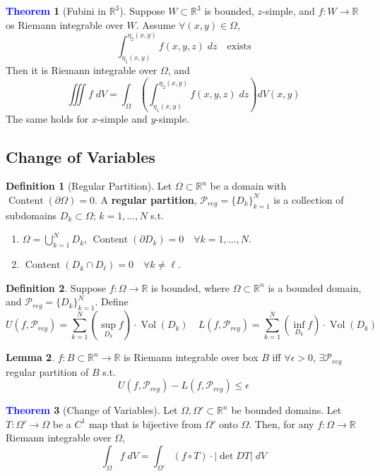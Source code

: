 \documentclass[11pt]{article}
\theoremstyle{definition}
\theoremstyle{definition}
\newcommand{\R}[0]{\mathbb{R}}
\DeclareMathOperator{\Vol}{Vol}
\DeclareMathOperator{\Content}{Content}
\newtheorem{theorem}{\textcolor{blue}{Theorem}}
\newtheorem{lemma}[theorem]{Lemma}
\theoremstyle{definition}
\newtheorem{definition}{\textcolor{OliveGreen}{Definition}}
\theoremstyle{remark}
\begin{document}
\begin{theorem}[Fubini in $\R^3$]
    Suppose $W \subset \R^3$ is bounded, $z$-simple, and $f : W \to \R$ os Riemann integrable over $W$. Assume
    $\forall (x,y) \in \Omega$, 
    \[
        \int_{\eta_1(x,y)}^{\eta_2(x,y)} f(x,y,z) \; dz \quad \text{exists}
    \]     
    Then it is Riemann integrable over $\Omega$, and
    \[
        \iiint f \; dV = \int_{\Omega} \left( \int_{\eta_1(x,y)}^{\eta_2(x,y)} f(x,y,z) \; dz \right) dV(x,y)
    \]   
    The same holds for $x$-simple and $y$-simple.  
\end{theorem}

\subsection{Change of Variables}

\begin{definition}[Regular Partition]
    Let $\Omega \subset \R^n$ be a domain with $\Content(\partial \Omega) = 0$. A \textbf{regular partition},
    $\mathcal{P}_{reg} = \{D_{k}\}_{k=1}^{N} $ is a collection of subdomains $D_k \subset \Omega$; $k = 1, \dots, N$ s.t.
    \begin{enumerate}
        \item $\Omega = \bigcup_{k = 1}^N D_k$, $\Content(\partial D_k) = 0 \quad \forall k = 1, \dots, N$.
        \item $\Content(D_k \cap D_\ell) = 0 \quad \forall k \neq \ell$.   
    \end{enumerate}     
\end{definition}

\begin{definition}
    Suppose $f : \Omega \to \R$ is bounded, where $\Omega \subset \R^n$ is a bounded domain, and $\mathcal{P}_{reg} = \{D_k\}_{k = 1}^N$.
    Define 
    \[
        U(f, \mathcal{P}_{reg}) = \sum_{k = 1}^N (\sup_{D_k} f) \cdot \Vol(D_k) \quad L(f, \mathcal{P}_{reg}) = \sum_{k = 1}^N (\inf_{D_k} f) \cdot \Vol(D_k)
    \]    
\end{definition}

\begin{lemma}
    $f : B \subset \R^n \to \R$ is Riemann integrable over box $B$ iff $\forall \epsilon > 0$, $\exists \mathcal{P}_{reg}$ regular partition of $B$ s.t.
    \[
        U(f, \mathcal{P}_{reg}) - L(f, \mathcal{P}_{reg}) \leq \epsilon
    \]   
\end{lemma}

\begin{theorem}[Change of Variables]
    Let $\Omega, \Omega' \subset \R^n$ be bounded domains. Let $T : \Omega' \to \Omega$ be a $C^1$ map that is bijective from $\Omega' $ onto $\Omega$.
    Then, for any $f : \Omega \to \R$ Riemann integrable over $\Omega$,
    \[
        \int_{\Omega} f \; dV = \int_{\Omega'} (f \circ T) \cdot |\det DT| \; dV
    \]       
\end{theorem}
\end{document}
